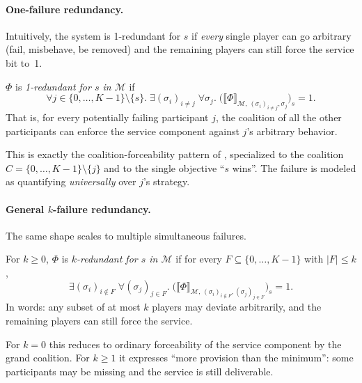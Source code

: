 \paragraph{One-failure redundancy.}
Intuitively, the system is 1-redundant for $s$ if \emph{every} single player
can go arbitrary (fail, misbehave, be removed) and the remaining players can
still force the service bit to~1.

\begin{definition}
\label{def:1-redundancy}
$\Phi$ is \emph{1-redundant for $s$ in $\mathcal M$} if
\[
  \forall j \in \{0,\dots,K-1\} \setminus \{s\}.\;
  \exists (\sigma_i)_{i \ne j}\;
  \forall \sigma_j.\;
  \bigl(\llbracket \Phi \rrbracket_{\mathcal M, \, (\sigma_i)_{i \ne j}, \sigma_j}\bigr)_s = 1.
\]
That is, for every potentially failing participant $j$, the coalition of all the
other participants can enforce the service component against $j$'s arbitrary
behavior.
\end{definition}

This is exactly the coalition-forceability pattern of
, specialized to the coalition
$C = \{0,\dots,K-1\} \setminus \{j\}$ and to the single objective ``$s$ wins''.
The failure is modeled as quantifying \emph{universally} over $j$'s strategy.

\paragraph{General $k$-failure redundancy.}
The same shape scales to multiple simultaneous failures.

\begin{definition}
\label{def:k-redundancy}
For $k \ge 0$, $\Phi$ is \emph{$k$-redundant for $s$ in $\mathcal M$} if for
every $F \subseteq \{0,\dots,K-1\}$ with $|F|\le k$,
\[
  \exists (\sigma_i)_{i \notin F}\;
  \forall (\sigma_j)_{j \in F}.\;
  \bigl(\llbracket \Phi \rrbracket_{\mathcal M, \, (\sigma_i)_{i \notin F}, (\sigma_j)_{j \in F}}\bigr)_s = 1.
\]
In words: any subset of at most $k$ players may deviate arbitrarily, and the
remaining players can still force the service.
\end{definition}

For $k=0$ this reduces to ordinary forceability of the service component by the
grand coalition. For $k\ge 1$ it expresses ``more provision than the minimum'':
some participants may be missing and the service is still deliverable.

